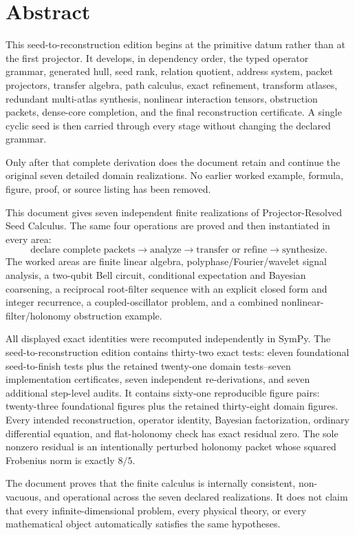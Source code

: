 \documentclass[11pt,oneside]{book}
\theoremstyle{definition}
\theoremstyle{remark}
\begin{document}
\chapter*{Abstract}
This seed-to-reconstruction edition begins at the primitive datum rather than at the first projector.  It develops, in dependency order, the typed operator grammar, generated hull, seed rank, relation quotient, address system, packet projectors, transfer algebra, path calculus, exact refinement, transform atlases, redundant multi-atlas synthesis, nonlinear interaction tensors, obstruction packets, dense-core completion, and the final reconstruction certificate.  A single cyclic seed is then carried through every stage without changing the declared grammar.

Only after that complete derivation does the document retain and continue the original seven detailed domain realizations.  No earlier worked example, formula, figure, proof, or source listing has been removed.

This document gives seven independent finite realizations of Projector-Resolved Seed Calculus. The same four operations are proved and then instantiated in every area:
\[
\boxed{
\text{declare complete packets}
\longrightarrow
\text{analyze}
\longrightarrow
\text{transfer or refine}
\longrightarrow
\text{synthesize}.
}
\]
The worked areas are finite linear algebra, polyphase/Fourier/wavelet signal analysis, a two-qubit Bell circuit, conditional expectation and Bayesian coarsening, a reciprocal root-filter sequence with an explicit closed form and integer recurrence, a coupled-oscillator problem, and a combined nonlinear-filter/holonomy obstruction example.

All displayed exact identities were recomputed independently in SymPy. The seed-to-reconstruction edition contains thirty-two exact tests: eleven foundational seed-to-finish tests plus the retained twenty-one domain tests--seven implementation certificates, seven independent re-derivations, and seven additional step-level audits.  It contains sixty-one reproducible figure pairs: twenty-three foundational figures plus the retained thirty-eight domain figures. Every intended reconstruction, operator identity, Bayesian factorization, ordinary differential equation, and flat-holonomy check has exact residual zero. The sole nonzero residual is an intentionally perturbed holonomy packet whose squared Frobenius norm is exactly $8/5$.

The document proves that the finite calculus is internally consistent, non-vacuous, and operational across the seven declared realizations. It does not claim that every infinite-dimensional problem, every physical theory, or every mathematical object automatically satisfies the same hypotheses.
\end{document}
